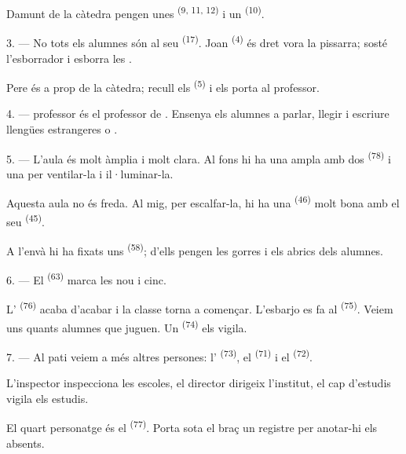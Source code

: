Damunt de la càtedra pengen unes 
\textsuperscript{(9, 11, 12)} i un  \textsuperscript{(10)}.

3. --- No tots els alumnes són al seu  \textsuperscript{(17)}. Joan
\textsuperscript{(4)} és dret vora la pissarra; sosté l'esborrador i esborra les
.

Pere és a prop de la càtedra; recull els 
\textsuperscript{(5)} i els porta al professor.

4. ---  professor és el professor de .
Ensenya els alumnes a parlar, llegir i escriure llengües estrangeres
 o .

5. --- L'aula és molt àmplia i molt clara. Al fons hi ha una 
ampla amb dos  \textsuperscript{(78)} i una  per ventilar-la i il·luminar-la.

Aquesta aula no és freda. Al mig, per escalfar-la, hi ha una 
\textsuperscript{(46)} molt bona amb el seu  \textsuperscript{(45)}.

A l'envà hi ha fixats uns  \textsuperscript{(58)}; d'ells
pengen les gorres i els abrics dels alumnes.

\VUsaut{5.2mm}
\VUsaut{3.6mm}

6. --- El  \textsuperscript{(63)} marca les nou i cinc.

L' \textsuperscript{(76)} acaba d'acabar i la classe torna a
començar. L'esbarjo es fa al  \textsuperscript{(75)}. Veiem uns
quants alumnes que juguen. Un  \textsuperscript{(74)} els
vigila.

7. --- Al pati veiem a més altres persones: l'
\textsuperscript{(73)}, el  \textsuperscript{(71)} i el
 \textsuperscript{(72)}.

L'inspector inspecciona les escoles, el director dirigeix l'institut, el cap
d'estudis vigila els estudis.

El quart personatge és el  \textsuperscript{(77)}. Porta sota el
braç un registre per anotar-hi els absents.


